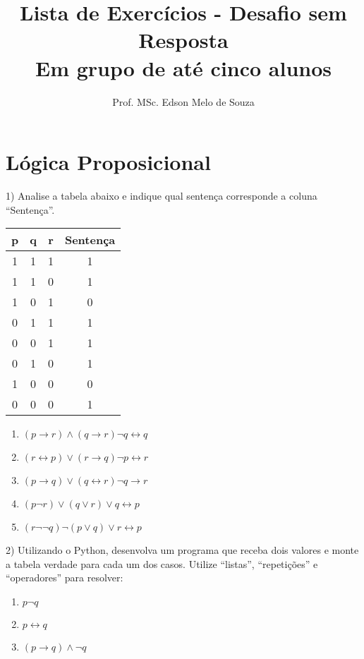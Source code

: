 \documentclass[12pt,a4paper]{article}
\title{\textbf{Lista de Exercícios - Desafio sem Resposta}\\Em grupo de até cinco alunos}
\author{Prof. MSc. Edson Melo de Souza}
\date{\vspace{-5ex}}
\begin{document}
	 
	\maketitle
	\thispagestyle{empty}

	\section{Lógica Proposicional}
		1) Analise a tabela abaixo e indique qual sentença corresponde a coluna ``Sentença''.
		\begin{table}[h!]
		\centering

		\begin{tabular}{|c|c|c|c|}
			\hline
			p & q & r & Sentença \\ \hline
			1 & 1 & 1 & 1        \\ \hline
			1 & 1 & 0 & 1        \\ \hline
			1 & 0 & 1 & 0        \\ \hline
			0 & 1 & 1 & 1        \\ \hline
			0 & 0 & 1 & 1        \\ \hline
			0 & 1 & 0 & 1        \\ \hline
			1 & 0 & 0 & 0        \\ \hline
			0 & 0 & 0 & 1        \\ \hline
			\end{tabular}%
		
		\end{table}
		\begin{enumerate}
			\item \( ( p \to r ) \wedge ( q \to r ) \neg q \leftrightarrow q \)
			\item \( ( r \leftrightarrow p ) \vee ( r \to q ) \neg p \leftrightarrow r \)
			\item \( ( p \to q ) \vee ( q \leftrightarrow r ) \neg q \to r \) %
			\item \( ( p \neg r ) \vee ( q \vee r ) \vee q \leftrightarrow p \)
			\item \( ( r \neg \neg q ) \neg ( p \vee q ) \vee r \leftrightarrow p \)
		\end{enumerate}

		2) Utilizando o Python, desenvolva um programa que receba dois valores e monte a tabela verdade para cada um dos casos. Utilize ``listas'', ``repetições'' e ``operadores'' para resolver:
		\begin{enumerate}
			\item \( p \neg q \)
			\item \( p \leftrightarrow q \)
			\item \( (p \to q) \wedge \neg q\)

		\end{enumerate}
\end{document}
